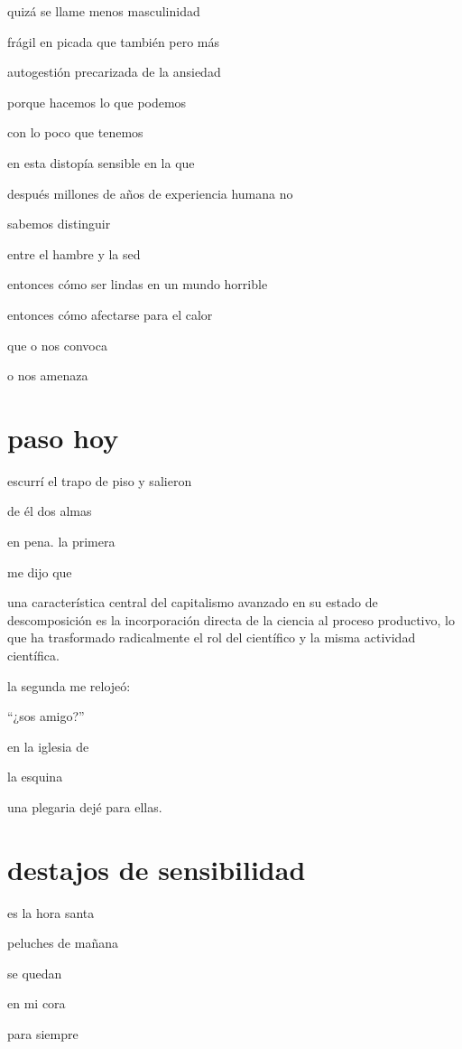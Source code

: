 \documentclass[
]{book}
\begin{document}
quizá se llame menos masculinidad

frágil en picada que también pero más

autogestión precarizada de la ansiedad

porque hacemos lo que podemos

con lo poco que tenemos

en esta distopía sensible en la que

después millones de años de experiencia humana no

sabemos distinguir

entre el hambre y la sed

entonces cómo ser lindas en un mundo horrible

entonces cómo afectarse para el calor

que o nos convoca

o nos amenaza

\hypertarget{paso-hoy}{%
\chapter{paso hoy}\label{paso-hoy}}

escurrí el trapo de piso y salieron

de él dos almas

en pena. la primera

me dijo que

una característica central del capitalismo avanzado en su estado de descomposición es la incorporación directa de la ciencia al proceso productivo, lo que ha trasformado radicalmente el rol del científico y la misma actividad científica.

la segunda me relojeó:

``¿sos amigo?''

en la iglesia de

la esquina

una plegaria dejé para ellas.

\hypertarget{destajos-de-sensibilidad}{%
\chapter{destajos de sensibilidad}\label{destajos-de-sensibilidad}}

es la hora santa

peluches de mañana

se quedan

en mi cora

para siempre
\end{document}
